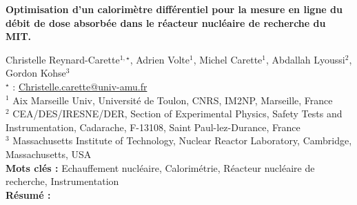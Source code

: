 


    \newpage

\BgThispage

%
\begin{flushleft}
\addtocounter{section}{1}
{\Large \textbf{Optimisation d'un calorimètre différentiel pour la mesure en ligne du débit de dose absorbée dans le réacteur nucléaire de recherche du MIT.}}\label{ref:74}
\end{flushleft}
%
Christelle Reynard-Carette$^{1,\star}$, Adrien Volte$^{1}$, Michel Carette$^{1}$, Abdallah Lyoussi$^{2}$, Gordon Kohse$^{3}$\\[2mm]
$^{\star}$ \Letter : \url{Christelle.carette@univ-amu.fr}\\[2mm]
{\footnotesize $^{1}$ Aix Marseille Univ, Université de Toulon, CNRS, IM2NP, Marseille, France}\\
{\footnotesize $^{2}$ CEA/DES/IRESNE/DER, Section of Experimental Physics, Safety Tests and Instrumentation, Cadarache, F-13108, Saint Paul-lez-Durance, France}\\
{\footnotesize $^{3}$ Massachusetts Institute of Technology, Nuclear Reactor Laboratory, Cambridge, Massachusetts, USA}\\
[4mm]
%
\noindent \textbf{Mots clés : } Echauffement nucléaire, Calorimétrie, Réacteur nucléaire de recherche, Instrumentation\\[4mm]
%
\noindent \textbf{Résumé : } 

